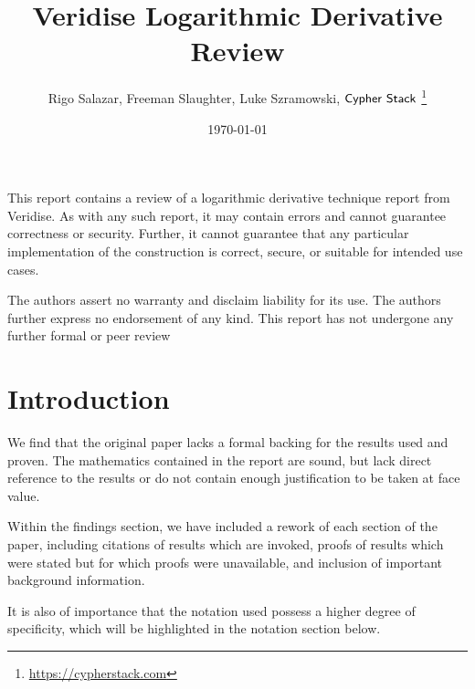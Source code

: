 \documentclass{article}
\title{Veridise Logarithmic Derivative Review}
\author{Rigo Salazar, Freeman Slaughter, Luke Szramowski, $\sf{Cypher \ Stack}$
\thanks{\url{https://cypherstack.com}}}
\date{\today}
\theoremstyle{definition}
\newcommand{\6}{\mathbf}
\newcommand{\7}{\mathcal}
\begin{document}
\maketitle

This report contains a review of a logarithmic derivative technique report from Veridise. As with any such report, it may contain errors and cannot guarantee correctness or security. Further, it cannot guarantee that any particular implementation of the construction is correct, secure, or suitable for intended use cases. 

The authors assert no warranty and disclaim liability for its use. The authors further express no endorsement of any kind. This report has not undergone any further formal or peer review

\tableofcontents

\section{Introduction}



\hspace{\parindent} We find that the original paper \cite{BassaLogDeriv} lacks a formal backing for the results used and proven. The mathematics contained in the report are sound, but lack direct reference to the results or do not contain enough justification to be taken at face value.\par

\medskip 

Within the findings section, we have included a rework of each section of the paper, including citations of results which are invoked, proofs of results which were stated but for which proofs were unavailable, and inclusion of important background information.

\medskip 

It is also of importance that the notation used possess a higher degree of specificity, which will be highlighted in the notation section below.
\end{document}
